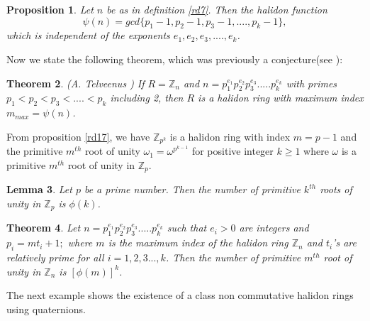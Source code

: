 \documentclass[sn-mathphys,Numbered]{sn-jnl}%
\theoremstyle{thmstyleone}
\newtheorem{theorem}{Theorem}
\newtheorem{proposition}[theorem]{Proposition}
\theoremstyle{thmstyletwo}
\theoremstyle{thmstylethree}
\newtheorem{lemma}[theorem]{Lemma}
\begin{document}
\begin{proposition}
Let $n$ be as in definition \ref{rd7}. Then the halidon function $$\psi(n)=gcd\{ p_{1}-1,p_{2}-1,p_{3}-1,....,p_{k}-1\},$$ which is independent of the exponents $e_{1},e_{2},e_{3},....,e_{k}$.
\end{proposition}
Now we state the following theorem, which was previously a conjecture(see \cite{ath2}):
 \begin{theorem}\label{rd1}(A. Telveenus \cite{ath2})
If $R=\mathbb{Z}_{n}$ and $n=p_{1}^{e_{1}}p_{2}^{e_{2}}p_{3}^{e_{3}}.....p_{k}^{e_{k}}$ with primes $p_{1}<p_{2}<p_{3}<....<p_{k}$ including 2, then $R$ is a halidon ring with maximum index $m_{max}=\psi(n)$.
\end{theorem}
From proposition \ref{rd17}, we have $\mathbb{Z}_{p^{k}}$ is a halidon ring with index $m=p-1$ and the primitive $m^{th}$ root of unity $\omega_{1}=\omega^{p^{k-1}}$ for positive integer $k\geq 1$ where $\omega$ is a primitive $m^{th}$ root of unity in $\mathbb{Z}_{p}$.
\begin{lemma} \label{rd11}
Let $p$ be a prime number. Then the number of primitive $k^{th}$ roots of unity in $\mathbb{Z}_{p}$ is $\phi(k)$.
\end{lemma}
\begin{theorem} \label{rd19}
Let $n=p_{1}^{e_{1}}p_{2}^{e_{2}}p_{3}^{e_{3}}.....p_{k}^{e_{k}}$ such that $e_{i}>0$ are integers and $p_{i}=mt_{i}+1;$ where $m$ is the maximum index of the halidon ring $\mathbb{Z}_{n}$ and $t_{i}$'s are relatively prime for all $i=1,2,3...,k$. Then the number of primitive $m^{th}$ root of unity in $\mathbb{Z}_{n}$ is $[\phi(m)]^{k}$.
\end{theorem}
The next example shows the existence of a class non commutative halidon rings using quaternions. 
\end{document}
